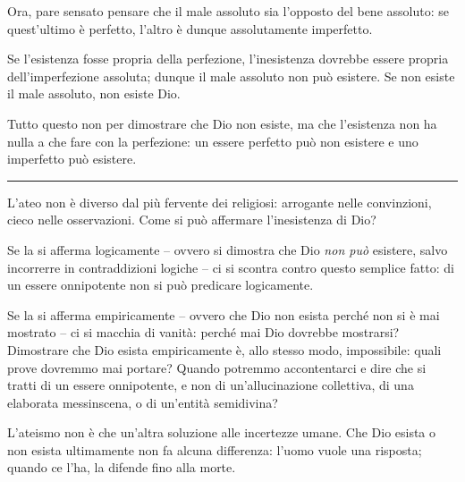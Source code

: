 Ora, pare sensato pensare che il male assoluto sia l'opposto del bene assoluto:
se quest'ultimo è perfetto, l'altro è dunque assolutamente imperfetto.

Se l'esistenza fosse propria della perfezione, l'inesistenza dovrebbe essere
propria dell'imperfezione assoluta; dunque il male assoluto non può esistere. Se
non esiste il male assoluto, non esiste Dio.

Tutto questo non per dimostrare che Dio non esiste, ma che l'esistenza non ha
nulla a che fare con la perfezione: un essere perfetto può non esistere e uno
imperfetto può esistere.

\plainbreak{1}

L'ateo non è diverso dal più fervente dei religiosi: arrogante nelle
convinzioni, cieco nelle osservazioni. Come si può affermare l'inesistenza di
Dio?

Se la si afferma logicamente -- ovvero si dimostra che Dio \emph{non può}
esistere, salvo incorrerre in contraddizioni logiche -- ci si scontra contro
questo semplice fatto: di un essere onnipotente non si può predicare
logicamente.

Se la si afferma empiricamente -- ovvero che Dio non esista perché non si è mai
mostrato -- ci si macchia di vanità: perché mai Dio dovrebbe mostrarsi?
Dimostrare che Dio esista empiricamente è, allo stesso modo, impossibile: quali
prove dovremmo mai portare? Quando potremmo accontentarci e dire che si tratti
di un essere onnipotente, e non di un'allucinazione collettiva, di una elaborata
messinscena, o di un'entità semidivina?

L'ateismo non è che un'altra soluzione alle incertezze umane. Che Dio esista o
non esista ultimamente non fa alcuna differenza: l'uomo vuole una risposta;
quando ce l'ha, la difende fino alla morte.
